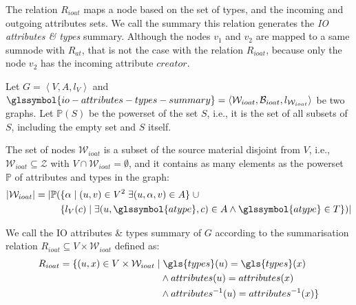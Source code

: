 The relation $R_{ioat}$ maps a node based on the set of \gls{types}, and the incoming and outgoing \gls{attributes} sets. We call the summary this relation generates the \emph{IO attributes \& types} summary.
Although the nodes $v_1$ and $v_2$ are mapped to a same sumnode with $R_{at}$, that is not the case with the relation $R_{ioat}$, because only the node $v_2$ has the incoming attribute $creator$.

\begin{definition}
	Let $G=\left\langle V, A, l_V \right\rangle$ and $\glssymbol{io-attributes-types-summary} = \left\langle \mathcal{W}_{ioat}, \mathcal{B}_{ioat}, l_{\mathcal{W}_{ioat}} \right\rangle$ be two graphs. Let $\mathbb{P}(S)$ be the powerset of the set $S$, i.e., it is the set of all subsets of $S$, including the empty set and $S$ itself.

	The set of nodes $\mathcal{W}_{ioat}$ is a subset of the source material disjoint from $V$, i.e., $\mathcal{W}_{ioat} \subseteq \mathcal{Z}$ with $V \cap \mathcal{W}_{ioat} = \emptyset$, and it contains as many elements as the powerset $\mathbb{P}$ of attributes and types in the graph:
	$$
	\begin{aligned}
	\lvert \mathcal{W}_{ioat} \rvert = \lvert \mathbb{P} ( & \{ \alpha \mid (u, v) \in V^2\; \exists (u, \alpha, v) \in A \} \;\cup \\
	& \{ l_V(c) \mid \exists (u, \glssymbol{atype}, c) \in A \wedge \glssymbol{atype} \in T \} ) \rvert
	\end{aligned}
	$$

	We call  the IO attributes \& types summary of $G$ according to the summarisation relation $R_{ioat} \subseteq V \times \mathcal{W}_{ioat}$ defined as:
	$$
	\begin{aligned}
		R_{ioat} = \{ (u, x) \in V \times \mathcal{W}_{ioat} \mid &\; \gls{types}(u) = \gls{types}(x) \\
	& \wedge attributes(u) = attributes(x) \\
	& \wedge attributes^{-1}(u) = attributes^{-1}(x) \}
	\end{aligned}
	$$
	\label{chap4:summary:def:incoming--outgoing-attributes-types}
\end{definition}
\vspace{.5cm}

